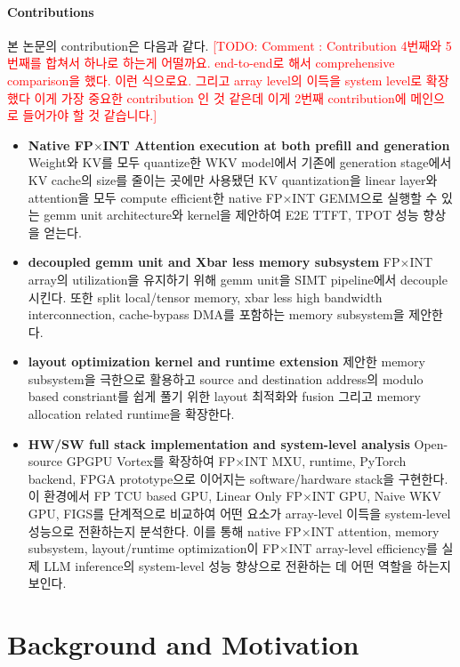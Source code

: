 \documentclass[11pt]{article}
\newcommand{\todo}[1]{\textcolor{red}{[TODO: #1]}}
\newcommand{\fpint}{FP$\times$INT}
\newcommand{\wkv}{WKV}
\newcommand{\Cone}{FP TCU based GPU}
\newcommand{\Ctwo}{Linear Only FP$\times$INT GPU}
\newcommand{\Cthr}{Naive WKV GPU}
\newcommand{\Cfou}{FIGS}
\begin{document}
\paragraph{Contributions}
본 논문의 contribution은 다음과 같다. \todo{Comment : Contribution 4번째와 5번째를 합쳐서 하나로 하는게 어떨까요. end-to-end로 해서 comprehensive comparison을 했다. 이런 식으로요. 그리고 array level의 이득을 system level로 확장했다 이게 가장 중요한 contribution 인 것 같은데 이게 2번째 contribution에 메인으로 들어가야 할 것 같습니다.}
\begin{itemize}[leftmargin=*]
    \item \textbf{Native \fpint{} Attention execution at both prefill and generation}
    Weight와 KV를 모두 quantize한 \wkv{} model에서 기존에 generation stage에서 KV cache의 size를 줄이는 곳에만 사용됐던 KV quantization을 linear layer와 attention을 모두 compute efficient한 native \fpint{} GEMM으로 실행할 수 있는 gemm unit architecture와 kernel을 제안하여 E2E TTFT, TPOT 성능 향상을 얻는다.
    
    \item \textbf{decoupled gemm unit and Xbar less memory subsystem}
    \fpint{} array의 utilization을 유지하기 위해 gemm unit을 SIMT pipeline에서 decouple 시킨다. 또한 split local/tensor memory, xbar less high bandwidth interconnection, cache-bypass DMA를 포함하는 memory subsystem을 제안한다.

    \item \textbf{layout optimization kernel and runtime extension}
    제안한 memory subsystem을 극한으로 활용하고 source and destination address의 modulo based constriant를 쉽게 풀기 위한 layout 최적화와 fusion 그리고 memory allocation related runtime을 확장한다.

    \item \textbf{HW/SW full stack implementation and system-level analysis} Open-source GPGPU Vortex를 확장하여 \fpint{} MXU, runtime, PyTorch backend, FPGA prototype으로 이어지는 software/hardware stack을 구현한다.
    이 환경에서 \Cone{}, \Ctwo{}, \Cthr{}, \Cfou{}를 단계적으로 비교하여 어떤 요소가 array-level 이득을 system-level 성능으로 전환하는지 분석한다.
    이를 통해 native \fpint{} attention, memory subsystem, layout/runtime optimization이 \fpint{} array-level efficiency를 실제 LLM inference의 system-level 성능 향상으로 전환하는 데 어떤 역할을 하는지 보인다.
\end{itemize}

\section{Background and Motivation}
\end{document}

